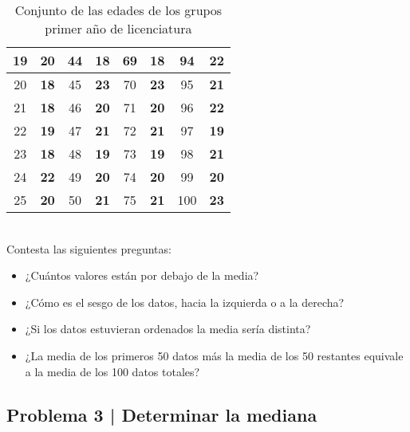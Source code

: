 \documentclass{article}
\begin{document}
\begin{table}[h!]
\begin{tabular}{|c|c|c|c|c|c|c|c|}
    19 & \textbf{20} & 44 & \textbf{18} & 69 & \textbf{18} & 94 & \textbf{22} \\ \hline
    20 & \textbf{18} & 45 & \textbf{23} & 70 & \textbf{23} & 95 & \textbf{21} \\ \hline
    21 & \textbf{18} & 46 & \textbf{20} & 71 & \textbf{20} & 96 & \textbf{22} \\ \hline
    22 & \textbf{19} & 47 & \textbf{21} & 72 & \textbf{21} & 97 & \textbf{19} \\ \hline
    23 & \textbf{18} & 48 & \textbf{19} & 73 & \textbf{19} & 98 & \textbf{21} \\ \hline
    24 & \textbf{22} & 49 & \textbf{20} & 74 & \textbf{20} & 99 & \textbf{20} \\ \hline
    25 & \textbf{20} & 50 & \textbf{21} & 75 & \textbf{21} & 100 & \textbf{23} \\ \hline
    \end{tabular}
    \caption{Conjunto de las edades de los grupos primer año de licenciatura}
\end{table}
\\
Contesta las siguientes preguntas:
\begin{itemize}
    \item ¿Cuántos valores están por debajo de la media?
    \item ¿Cómo es el sesgo de los datos, hacia la izquierda o a la derecha?
    \item ¿Si los datos estuvieran ordenados la media sería distinta?
    \item ¿La media de los primeros 50 datos más la media de los 50 restantes equivale a la media de los 100 datos totales?
\end{itemize}

\clearpage

\subsection{Problema 3 | Determinar la mediana}
\end{document}
